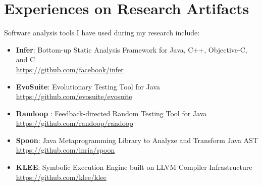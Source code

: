 \section{Experiences on Research Artifacts}
Software analysis tools I have used during my research include:
\vspace{1mm}
\begin{itemize}
\item \textbf{Infer}: Bottom-up Static Analysis Framework for Java, C++, Objective-C, and C \\
\url{https://github.com/facebook/infer}
\vspace{1mm}
\item \textbf{EvoSuite}: Evolutionary Testing Tool for Java \\
\url{https://github.com/evosuite/evosuite}
\vspace{1mm}
\item \textbf{Randoop} : Feedback-directed Random Testing Tool for Java \\
\url{https://github.com/randoop/randoop}
\vspace{1mm}
\item \textbf{Spoon}: Java Metaprogramming Library to Analyze and Transform Java AST \\
\url{https://github.com/inria/spoon}
\vspace{1mm}
\item \textbf{KLEE}: Symbolic Execution Engine built on LLVM Compiler Infrastructure \\
\url{https://github.com/klee/klee}
\end{itemize}

\vspace{9mm}
